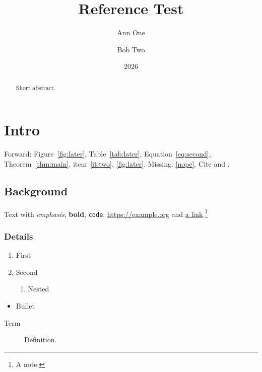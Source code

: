 \documentclass{report}
\title{Reference Test}
\author{Ann One \and Bob Two}
\date{2026}
\begin{document}
\maketitle
\begin{abstract}
Short abstract.
\end{abstract}
\chapter{Intro}\label{ch:intro}
Forward: Figure~\ref{fig:later}, Table~\ref{tab:later}, Equation~\eqref{eq:second}, Theorem~\ref{thm:main}, item~\ref{it:two}, \cref{fig:later}.
Missing: \ref{nope}. Cite \cite{alpha} and \cite{beta,gamma}.
\section{Background}\label{sec:bg}
Text with \emph{emphasis}, \textbf{bold}, \texttt{code}, \url{https://example.org} and \href{https://example.com}{a link}.\footnote{A note.\label{fn:one}}
\subsection{Details}\label{sec:details}
\begin{enumerate}
  \item First
  \item\label{it:two} Second
  \begin{enumerate}
    \item\label{it:nested} Nested
  \end{enumerate}
\end{enumerate}
\begin{itemize}
  \item Bullet
\end{itemize}
\begin{description}
  \item[Term] Definition.
\end{description}
\end{document}
